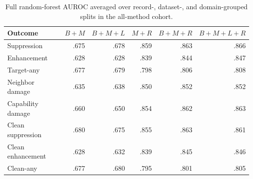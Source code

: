 \begin{table}[t]
\centering
\caption{Full random-forest AUROC averaged over record-, dataset-, and
domain-grouped splits in the all-method cohort.}
\label{tab:full-prediction-auroc}
\begin{tabular}{lrrrrr}
\toprule
Outcome & $B+M$ & $B+M+L$ & $M+R$ & $B+M+R$ & $B+M+L+R$ \\
\midrule
Suppression & .675 & .678 & .859 & .863 & .866 \\
Enhancement & .628 & .628 & .839 & .844 & .847 \\
Target-any & .677 & .679 & .798 & .806 & .808 \\
Neighbor damage & .635 & .638 & .850 & .852 & .852 \\
Capability damage & .660 & .650 & .854 & .862 & .863 \\
Clean suppression & .680 & .675 & .855 & .863 & .861 \\
Clean enhancement & .628 & .632 & .839 & .845 & .846 \\
Clean-any & .677 & .680 & .795 & .801 & .805 \\
\bottomrule
\end{tabular}
\end{table}
